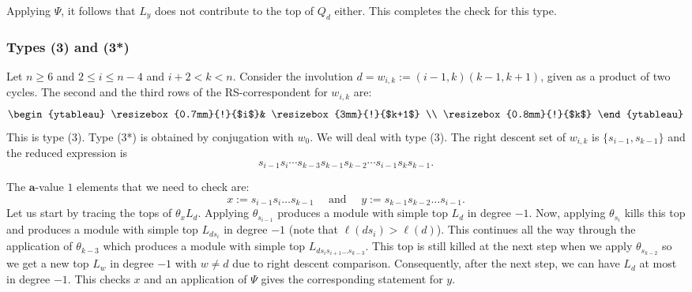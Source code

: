 \documentclass[a4paper]{amsart}
\begin{document}
Applying $\Psi$, it follows that $L_y$ does not
contribute to the top of $Q_d$ either.
This completes the check for this type.


\subsubsection{Types (3) and (3*)}\label{s6.2.3}

Let $n\geq 6$ and $2\leq i\leq n-4$ and $i+2<k<n$. Consider the involution
$d=w_{i,k}:=(i-1,k)(k-1,k+1)$, given as a product of two cycles.
The second and the third rows of the RS-correspondent for $w_{i,k}$
are:
\begin{displaymath}
\begin{ytableau}
\resizebox{0.7mm}{!}{$i$}&
\resizebox{3mm}{!}{$k+1$}
\\
\resizebox{0.8mm}{!}{$k$} 
\end{ytableau}
\end{displaymath}
This is type (3). Type (3*) is obtained by conjugation with $w_0$.
We will deal with type (3). The right descent set of 
$w_{i,k}$ is $\{s_{i-1},s_{k-1}\}$ and the reduced expression is 
\begin{equation}\label{eq:redexp5}
s_{i-1}s_{i}\cdots s_{k-3}s_{k-1}s_{k-2}\cdots s_{i-1}s_{k}s_{k-1}.
\end{equation}

The $\mathbf{a}$-value $1$ elements that we need to check are:
\begin{displaymath}
x:=s_{i-1}s_{i}\dots s_{k-1}\quad\text{ and  }\quad
y:=s_{k-1}s_{k-2}\dots s_{i-1}.
\end{displaymath}
Let us start by tracing the tops of $\theta_x L_d$.
Applying $\theta_{s_{i-1}}$ produces a module with simple top
$L_d$ in degree $-1$. Now, applying $\theta_{s_{i}}$ kills
this top and produces a module with simple top $L_{ds_i}$ 
in degree $-1$ (note that $\ell(ds_i)>\ell(d)$). This continues
all the way through the application of  $\theta_{k-3}$ which
produces a module with simple top $L_{ds_is_{i+1}\dots s_{k-3}}$.
This top is still killed at the next step when we apply 
$\theta_{s_{k-2}}$ so we get a new top $L_{w}$ in degree
$-1$ with $w\neq d$ due to right descent comparison.
Consequently, after the next step, we can have $L_d$
at most in degree $-1$. This checks $x$ and an application of 
$\Psi$ gives the corresponding statement for $y$.
\end{document}
